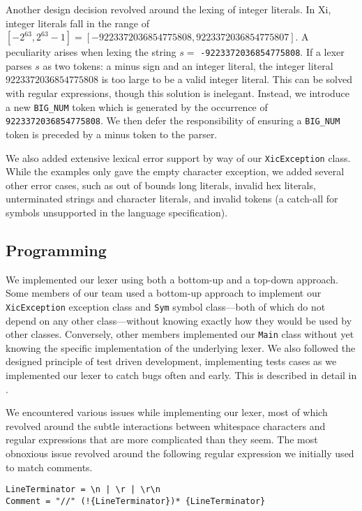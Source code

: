 \documentclass{hw}
\begin{document}
\newcommand{\minint}{9223372036854775808}
\newcommand{\maxint}{9223372036854775807}
Another design decision revolved around the lexing of integer literals. In Xi,
integer literals fall in the range of $[-2^{63}, 2^{63}-1] = [-\minint,
\maxint]$. A peculiarity arises when lexing the string $s = $
\texttt{-\minint}. If a lexer parses $s$ as two tokens: a minus sign and an
integer literal, the integer literal $\minint$ is too large to be a valid
integer literal. This can be solved with regular expressions, though this
solution is inelegant. Instead, we introduce a new \texttt{BIG\_NUM} token
which is generated by the occurrence of \texttt{\minint}. We then defer the
responsibility of ensuring a \texttt{BIG\_NUM} token is preceded by a minus
token to the parser.

We also added extensive lexical error support by way of our
\texttt{XicException} class. While the examples only gave the empty character
exception, we added several other error cases, such as out of bounds long
literals, invalid hex literals, unterminated strings and character literals,
and invalid tokens (a catch-all for symbols unsupported in the language
specification).

\subsection{Programming}
We implemented our lexer using both a bottom-up and a top-down approach. Some
members of our team used a bottom-up approach to implement our
\texttt{XicException} exception class and \texttt{Sym} symbol class---both
of which do not depend on any other class---without knowing exactly how they
would be used by other classes. Conversely, other members implemented our
\texttt{Main} class without yet knowing the specific implementation of the
underlying lexer. We also followed the designed principle of test driven
development, implementing tests cases as we implemented our lexer to catch bugs
often and early. This is described in detail in .

We encountered various issues while implementing our lexer, most of which
revolved around the subtle interactions between whitespace characters and
regular expressions that are more complicated than they seem. The most
obnoxious issue revolved around the following regular expression we initially
used to match comments.

\begin{center}
\begin{BVerbatim}
LineTerminator = \n | \r | \r\n
Comment = "//" (!{LineTerminator})* {LineTerminator}
\end{BVerbatim}
\end{center}
\end{document}
